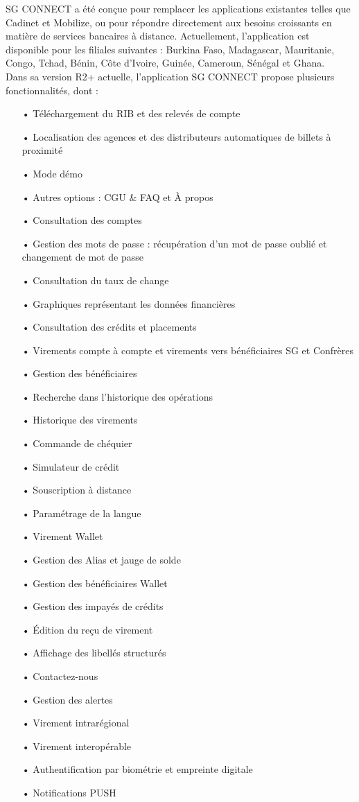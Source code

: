 SG CONNECT a été conçue pour remplacer les applications existantes telles que Cadinet et Mobilize, ou pour répondre directement aux besoins croissants en matière de services bancaires à distance. Actuellement, l'application est disponible pour les filiales suivantes : Burkina Faso, Madagascar, Mauritanie, Congo, Tchad, Bénin, Côte d'Ivoire, Guinée, Cameroun, Sénégal et Ghana.\\

Dans sa version R2+ actuelle, l'application SG CONNECT propose plusieurs fonctionnalités, dont :

\begin{itemize}
    \item[•] Téléchargement du RIB et des relevés de compte
    \item[•] Localisation des agences et des distributeurs automatiques de billets à proximité
   \item[•] Mode démo
   \item[•] Autres options : CGU \& FAQ et À propos
   \item[•] Consultation des comptes
   \item[•] Gestion des mots de passe : récupération d'un mot de passe oublié et changement de mot de passe
   \item[•] Consultation du taux de change
   \item[•] Graphiques représentant les données financières
   \item[•] Consultation des crédits et placements
   \item[•] Virements compte à compte et virements vers bénéficiaires SG et Confrères
   \item[•] Gestion des bénéficiaires
   \item[•] Recherche dans l'historique des opérations
   \item[•] Historique des virements
   \item[•] Commande de chéquier
  \item[•]  Simulateur de crédit
   \item[•] Souscription à distance
   \item[•] Paramétrage de la langue
   \item[•] Virement Wallet
   \item[•] Gestion des Alias et jauge de solde
   \item[•] Gestion des bénéficiaires Wallet
   \item[•] Gestion des impayés de crédits
   \item[•] Édition du reçu de virement
   \item[•] Affichage des libellés structurés
   \item[•] Contactez-nous
   \item[•] Gestion des alertes
   \item[•] Virement intrarégional
   \item[•] Virement interopérable
   \item[•] Authentification par biométrie et empreinte digitale
   \item[•] Notifications PUSH\\
\end{itemize}

